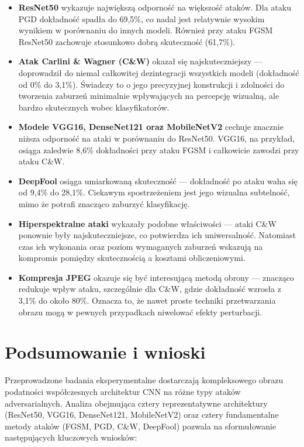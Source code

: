 \documentclass[12pt]{article}
\begin{document}
\begin{itemize}
    \item \textbf{ResNet50} wykazuje największą odporność na większość ataków. Dla ataku PGD dokładność spadła do 69{,}5\%, co nadal jest relatywnie wysokim wynikiem w porównaniu do innych modeli. Również przy ataku FGSM ResNet50 zachowuje stosunkowo dobrą skuteczność (61{,}7\%).
    
    \item \textbf{Atak Carlini \& Wagner (C\&W)} okazał się najskuteczniejszy --- doprowadził do niemal całkowitej dezintegracji wszystkich modeli (dokładność od 0\% do 3{,}1\%). Świadczy to o jego precyzyjnej konstrukcji i zdolności do tworzenia zaburzeń minimalnie wpływających na percepcję wizualną, ale bardzo skutecznych wobec klasyfikatorów.
    
    \item \textbf{Modele VGG16, DenseNet121 oraz MobileNetV2} cechuje znacznie niższa odporność na ataki w porównaniu do ResNet50. VGG16, na przykład, osiąga zaledwie 8{,}6\% dokładności przy ataku FGSM i całkowicie zawodzi przy ataku C\&W.
    
    \item \textbf{DeepFool} osiąga umiarkowaną skuteczność — dokładność po ataku waha się od 9{,}4\% do 28{,}1\%. Ciekawym spostrzeżeniem jest jego wizualna subtelność, mimo że potrafi znacząco zaburzyć klasyfikację.
    
    \item \textbf{Hiperspektralne ataki} wykazały podobne właściwości — ataki C\&W ponownie były najskuteczniejsze, co potwierdza ich uniwersalność. Natomiast czas ich wykonania oraz poziom wymaganych zaburzeń wskazują na kompromis pomiędzy skutecznością a kosztami obliczeniowymi.
    
    \item \textbf{Kompresja JPEG} okazuje się być interesującą metodą obrony — znacząco redukuje wpływ ataku, szczególnie dla C\&W, gdzie dokładność wzrosła z 3{,}1\% do około 80\%. Oznacza to, że nawet proste techniki przetwarzania obrazu mogą w pewnych przypadkach niwelować efekty perturbacji.
\end{itemize}

\section{Podsumowanie i wnioski}

Przeprowadzone badania eksperymentalne dostarczają kompleksowego obrazu podatności współczesnych architektur CNN na różne typy ataków adversarialnych. Analiza obejmująca cztery reprezentatywne architektury (ResNet50, VGG16, DenseNet121, MobileNetV2) oraz cztery fundamentalne metody ataków (FGSM, PGD, C\&W, DeepFool) pozwala na sformułowanie następujących kluczowych wniosków:
\end{document}
